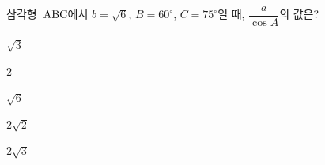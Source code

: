 삼각형~$\mathrm{ABC}$에서 $b=\sqrt{6}$, $B=60^\circ$, $C=75^\circ$일 때, $\dfrac{a}{\cos A}$의 값은?
\begin{choices32}{\rule[-3ex]{0pt}{8ex}$\sqrt{3}$}{\rule[-3ex]{0pt}{8ex}$2$}{\rule[-3ex]{0pt}{8ex}$\sqrt{6}$}{\rule[-3ex]{0pt}{8ex}$2\sqrt{2}$}{\rule[-3ex]{0pt}{8ex}$2\sqrt{3}$}\end{choices32}
